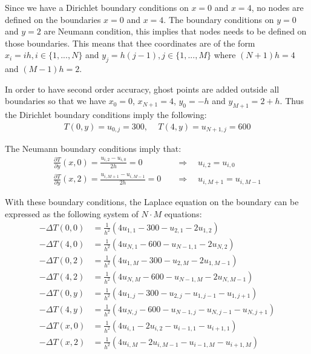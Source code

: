 \documentclass[11pt,a4paper,roman]{scrartcl}
\begin{document}
Since we have a Dirichlet boundary conditions on $x=0$ and $x=4$, no nodes are defined on the boundaries $x=0$ and $x=4$. The boundary conditions on $y=0$ and $y=2$ are Neumann condition, this implies that nodes needs to be defined on those boundaries. This means that thee coordinates are of the form $x_i = ih, i\in \{1,...,N\}$ and $y_j = h(j-1), j\in \{1,..., M\}$ where $(N+1)h=4$ and $(M-1)h = 2$. 

In order to have second order accuracy, ghost points are added outside all boundaries so that we have $x_0 = 0$, $x_{N+1}=4$, $y_0 = -h$ and $y_{M+1} = 2+h$. Thus the Dirichlet boundary conditions imply the following: 
\begin{equation}
\begin{aligned}
T(0, y) = u_{0,j}=300 \textrm{, } \quad T(4,y) = u_{N+1, j} = 600
\end{aligned}
\end{equation}

The Neumann boundary conditions imply that: 
\begin{equation}
\begin{aligned}
\frac{\partial T}{\partial y}(x,0)=\frac{u_{i,2}-u_{i,0}}{2h} = 0 \quad & \Rightarrow \quad u_{i,2}=u_{i,0} \\
\frac{\partial T}{\partial y}(x,2)=\frac{u_{i,M+1}-u_{i,M-1}}{2h}=0 \quad & \Rightarrow \quad u_{i,M+1}=u_{i,M-1} 
\end{aligned}
\end{equation}

With these boundary conditions, the Laplace equation on the boundary can be expressed as the following system of $N\cdot M$ equations: 
\begin{equation}
\begin{aligned}
-\Delta T(0, 0) & = \frac{1}{h^2}\left( 4u_{1,1} - 300 - u_{2,1} - 2u_{1,2} \right) \\
-\Delta T(4, 0) & = \frac{1}{h^2}\left( 4u_{N,1} - 600 - u_{N-1,1} - 2u_{N,2} \right) \\
-\Delta T(0, 2) & = \frac{1}{h^2}\left( 4u_{1,M} - 300 - u_{2,M} - 2u_{1,M-1} \right) \\
-\Delta T(4, 2) & = \frac{1}{h^2}\left( 4u_{N,M} - 600 - u_{N-1,M} - 2u_{N,M-1} \right) \\
-\Delta T(0, y) & = \frac{1}{h^2}\left( 4u_{1,j} - 300 - u_{2,j} - u_{1,j-1} - u_{1,j+1} \right) \\
-\Delta T(4, y) & = \frac{1}{h^2}\left( 4u_{N,j} - 600 - u_{N-1,j} - u_{N,j-1} - u_{N,j+1} \right) \\
-\Delta T(x, 0) & = \frac{1}{h^2}\left( 4u_{i,1} - 2u_{i,2} - u_{i-1,1} - u_{i+1,1} \right) \\
-\Delta T(x, 2) & = \frac{1}{h^2}\left( 4u_{i,M} - 2u_{i,M-1} - u_{i-1,M} - u_{i+1,M} \right) \\
\end{aligned}
\end{equation}
\end{document}
